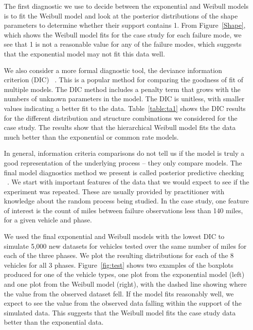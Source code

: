 \documentclass[12pt]{article}
\begin{document}
The first diagnostic we use to decide between the exponential and Weibull models is
to fit the Weibull model and look at the posterior distributions of the shape
parameters to determine whether their support contains 1. From Figure~\ref{Shape}, which shows the Weibull model fits for the case study for each failure mode, we see that 1 is not a reasonable value for any of the failure modes, which suggests that the exponential model may not fit this data well.

We also consider a more formal diagnostic tool, the deviance information criterion (DIC)
~\cite{ref5}. This is a popular method for comparing the goodness of fit of
multiple models. The DIC method includes a penalty term that grows with the
numbers of unknown parameters in the model.  The DIC is unitless, with smaller values indicating a better fit to the data.  Table~\ref{table:ta1} shows the DIC results for the different distribution and structure combinations we considered for the case study. The results show that the hierarchical Weibull model fits the data much better than the exponential or common rate models.

In general, information criteria
comparisons do not tell us if the model is truly a good representation of the
underlying process -- they only compare models. The final model diagnostics method we present is called
posterior predictive checking ~\cite{ref6}.  We start with important
features of the data that we would expect to see if the experiment was repeated.
These are usually provided by practitioner with knowledge about the random
process being studied. In the case study, one feature of interest is the count of miles between failure observations less than 140 miles, for a given vehicle and phase.

We used the final exponential and Weibull models with the lowest DIC to simulate 5,000 new datasets for vehicles tested over the same number of miles for each of the three phases. We plot the resulting distributions for each of the 8 vehicles for all 3 phases. Figure~\ref{fig:test} shows two examples of the boxplots produced for one of the vehicle types, one plot from the exponential model
(left) and one plot from the Weibull model (right), with the dashed line showing
where the value from the observed dataset fell. If the model fits reasonably well, we expect to see the value from the observed data falling within the support of the simulated data. This suggests that the Weibull model fits the case study data better than the exponential data.
\end{document}
